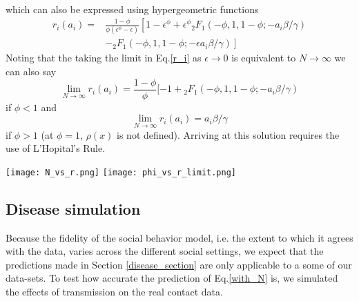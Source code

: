 \documentclass[10pt]{article}
\newenvironment{Figure}
  {\par\medskip\noindent\minipage{\linewidth}}
  {\endminipage\par\medskip}
\begin{document}
\begin{multicols}{2}
\begin{equation}
\begin{split}
\end{split}
\end{equation}
which can also be expressed using hypergeometric functions
\begin{equation}
\label{with_N}
\begin{split}
r_{i}(a_{i})=&\frac{1-\phi}{\phi(\epsilon^{\phi}-\epsilon)}\left[1-\epsilon^{\phi}+\epsilon^{\phi}{}_{2}F_{1}(-\phi,1,1-\phi;-a_{i}\beta/\gamma)\right.\\
&\left.-{}_{2}F_{1}(-\phi,1,1-\phi;-\epsilon a_{i}\beta/\gamma)\right]
\end{split}
\end{equation}
Noting that the taking the limit in Eq.\eqref{r_i} as $\epsilon\rightarrow 0$ is equivalent to  $N\rightarrow \infty$ we can also say
\begin{equation} 
\label{big_N}
\lim_{N\rightarrow\infty}r_{i}(a_{i}) =\frac{1-\phi}{\phi}[-1+{}_{2}F_{1}(-\phi,1,1-\phi;-a_{i}\beta/\gamma) 
\end{equation}
if $\phi<1$ and 
\begin{equation}
\label{big_N2}
\lim_{N\rightarrow\infty}r_{i}(a_{i}) =a_{i}\beta/\gamma 
\end{equation}
if $\phi>1$ (at $\phi=1$, $\rho(x)$ is not defined). Arriving at this solution requires the use of L'Hopital's Rule.

\begin{Figure}
 \centering
 \texttt{[image: N\_vs\_r.png]}
	\texttt{[image: phi\_vs\_r\_limit.png]}
\end{Figure}

\subsection{Disease simulation}
Because the fidelity of the social behavior model, i.e. the extent to which it agrees with the data, varies across the different social settings, we expect that the predictions made in Section \ref{disease_section} are only applicable to a some of our data-sets. To test how accurate the prediction of Eq.\eqref{with_N} is, we simulated the effects of transmission on the real contact data.


\end{multicols}
\end{document}
